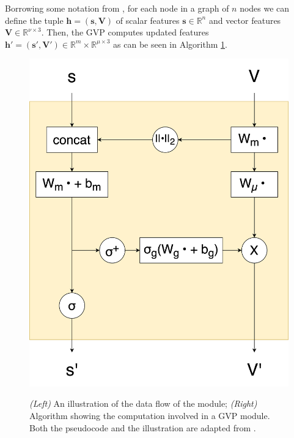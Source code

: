 Borrowing some notation from \cite{gvp1}, for each node in a graph of $n$ nodes we can define the tuple $\mathbf{h} = (\mathbf{s}, \mathbf{V})$ of scalar features $\mathbf{s}\in\mathbb{R}^{n}$ and vector features $\mathbf{V}\in \mathbb{R}^{\nu\times 3}$. Then, the GVP computes updated features $\mathbf{h}'=(\mathbf{s}', \mathbf{V}') \in \mathbb{R}^m\times\mathbb{R}^{\mu \times 3}$ as can be seen in Algorithm \ref{gvp-algo}.
\begin{figure}[!h]
    \begin{minipage}[b]{0.3\textwidth}
    \centering
    \includegraphics[width=\textwidth]{masters-report/figures/gvp.png}
    \label{fig:image}
  \end{minipage}
  \hfill
  \begin{minipage}[b]{0.65\textwidth}
    
  \end{minipage}
\caption{\textit{(Left)} An illustration of the data flow of the module; \textit{(Right)} Algorithm showing the computation involved in a GVP module.  Both the pseudocode and the illustration are adapted from \cite{gvp2}.}
\label{gvp-algo}
\end{figure}

